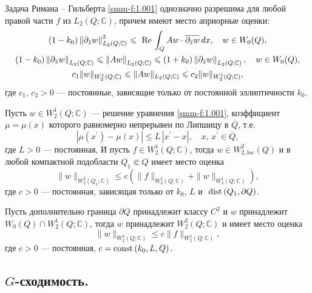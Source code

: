 \begin{theorem}\label{smm-th1.1}
Задача Римана -- Гильберта { \eqref{smm-f:1.001}} однозначно разрешима для любой правой части $f$ из $L_2(Q;\mathbb{C})$,
причем имеют место априорные оценки:
\begin{gather*}
(1-k_0)\left\|\partial_{\bar{z}}w\right\|^2_{L_2(Q;\mathbb{C})}\leqslant \text{ Re\,} \int_{Q} Aw\cdot \overline{\partial_{\bar{z}}w}\,dx,\quad w\in W_0(Q),\\
(1-k_0)\left\|\partial_{\bar{z}}w\right\|_{L_2(Q;\mathbb{C})}\leqslant \left\| Aw\right\|_{L_2(Q;\mathbb{C})} \leqslant
(1+k_0)\left\|\partial_{\bar{z}}w\right\|_{L_2(Q;\mathbb{C})}, \quad w\in W_0(Q),\\
	c_1\|w\|_{W^1_2(Q;\mathbb{C})}\leqslant\|Aw\|_{L_2(Q;\mathbb{C})}\leqslant c_2 \|w\|_{W^1_2(Q;\mathbb{C})},
\end{gather*}
где $c_1$, $c_2>0$ --- постоянные, зависящие только от постоянной эллиптичности $k_0$.


\hspace{5.mm} Пусть $w\in W_2^1(Q;\mathbb{C})$ --- решение уравнения  { \eqref{smm-f:1.001}}, коэффициент $\mu=\mu(x)$ которого равномерно непрерывен по Липшицу в $\overline Q$, т.е.
$$
|\mu(x^\prime)-\mu(x)|\leqslant L\,|x^\prime-x|,\quad x,\,x^\prime\in \overline{Q},
$$
где $L>0$ --- постоянная, И пусть  $f\in W_2^1(Q;\mathbb{C})$, тогда $w\in W_{2,\text{loc}}^2(Q)$ и в любой компактной подобласти $Q_1\Subset Q$ имеет место оценка
\begin{equation*}
	\|w\|_{W^2_2(Q_1; \mathbb{C})}\leqslant c\left(\|f\|_{W^1_2(Q; \mathbb{C})}+\|w\|_{W^1_2(Q; \mathbb{C})}\right),
\end{equation*}
где $c>0$ --- постоянная, зависящая только от $k_0$, $L$ и $\text{ dist\,}(Q_1,\partial Q)$.

\hspace{5.mm} Пусть дополнительно граница $\partial Q$ принадлежит классу $C^2$ и $w$ принадлежит $W_0(Q)\cap W_2^1(Q; \mathbb{C})$, тогда $w$ принадлежит $W_2^2(Q; \mathbb{C})$ и имеет место оценка
\begin{equation*}
\|w\|_{W^2_2(Q; \mathbb{C})}\leqslant c\|f\|_{W^1_2(Q; \mathbb{C})},
\end{equation*}
где $c>0$ --- постоянная, $c=\text{const\,}(k_0, L, Q)$.
\end{theorem}



\subsection{\texorpdfstring{$G$}{G}-сходимость.}

